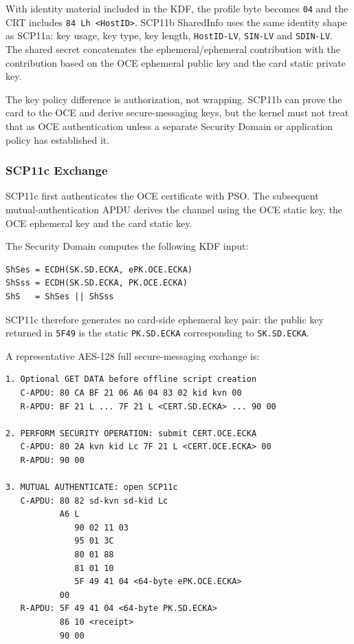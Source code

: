 With identity material included in the KDF, the profile byte becomes
\texttt{04} and the CRT includes \texttt{84 Lh <HostID>}. SCP11b SharedInfo
uses the same identity shape as SCP11a: key usage, key type, key length,
\texttt{HostID-LV}, \texttt{SIN-LV} and \texttt{SDIN-LV}. The shared secret
concatenates the ephemeral/ephemeral contribution with the contribution based
on the OCE ephemeral public key and the card static private key.

The key policy difference is authorization, not wrapping. SCP11b can prove the
card to the OCE and derive secure-messaging keys, but the kernel must not treat
that as OCE authentication unless a separate Security Domain or application
policy has established it.

\subsubsection{SCP11c Exchange}

SCP11c first authenticates the OCE certificate with PSO. The subsequent
mutual-authentication APDU derives the channel using the OCE static key, the
OCE ephemeral key and the card static key.

The Security Domain computes the following KDF input:

\begin{verbatim}
ShSes = ECDH(SK.SD.ECKA, ePK.OCE.ECKA)
ShSss = ECDH(SK.SD.ECKA, PK.OCE.ECKA)
ShS   = ShSes || ShSss
\end{verbatim}

SCP11c therefore generates no card-side ephemeral key pair: the public key
returned in \texttt{5F49} is the static \texttt{PK.SD.ECKA} corresponding to
\texttt{SK.SD.ECKA}.

A representative AES-128 full secure-messaging exchange is:

\begin{verbatim}
1. Optional GET DATA before offline script creation
   C-APDU: 80 CA BF 21 06 A6 04 83 02 kid kvn 00
   R-APDU: BF 21 L ... 7F 21 L <CERT.SD.ECKA> ... 90 00

2. PERFORM SECURITY OPERATION: submit CERT.OCE.ECKA
   C-APDU: 80 2A kvn kid Lc 7F 21 L <CERT.OCE.ECKA> 00
   R-APDU: 90 00

3. MUTUAL AUTHENTICATE: open SCP11c
   C-APDU: 80 82 sd-kvn sd-kid Lc
           A6 L
              90 02 11 03
              95 01 3C
              80 01 88
              81 01 10
              5F 49 41 04 <64-byte ePK.OCE.ECKA>
           00
   R-APDU: 5F 49 41 04 <64-byte PK.SD.ECKA>
           86 10 <receipt>
           90 00
\end{verbatim}

